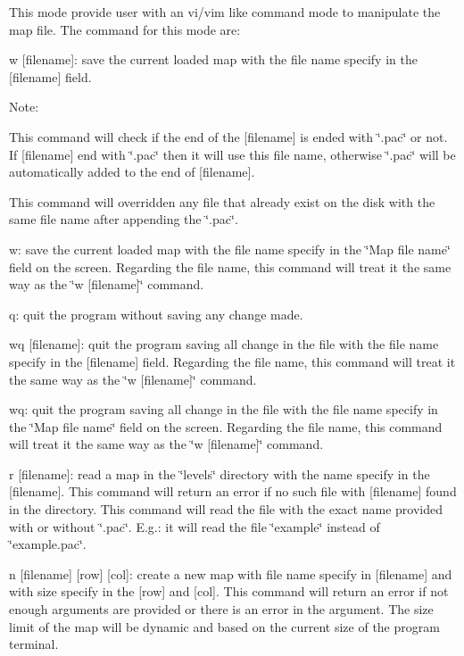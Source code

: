 This mode provide user with an vi/vim like command mode to manipulate the map file. The command for this mode are\-:

w \mbox{[}filename\mbox{]}\-: save the current loaded map with the file name specify in the \mbox{[}filename\mbox{]} field.

Note\-:

This command will check if the end of the \mbox{[}filename\mbox{]} is ended with \char`\"{}.\-pac\char`\"{} or not. If \mbox{[}filename\mbox{]} end with \char`\"{}.\-pac\char`\"{} then it will use this file name, otherwise \char`\"{}.\-pac\char`\"{} will be automatically added to the end of \mbox{[}filename\mbox{]}.

This command will overridden any file that already exist on the disk with the same file name after appending the \char`\"{}.\-pac\char`\"{}.

w\-: save the current loaded map with the file name specify in the \char`\"{}\-Map
      file name\char`\"{} field on the screen. Regarding the file name, this command will treat it the same way as the \char`\"{}w \mbox{[}filename\mbox{]}\char`\"{} command.

q\-: quit the program without saving any change made.

wq \mbox{[}filename\mbox{]}\-: quit the program saving all change in the file with the file name specify in the \mbox{[}filename\mbox{]} field. Regarding the file name, this command will treat it the same way as the \char`\"{}w \mbox{[}filename\mbox{]}\char`\"{} command.

wq\-: quit the program saving all change in the file with the file name specify in the \char`\"{}\-Map file name\char`\"{} field on the screen. Regarding the file name, this command will treat it the same way as the \char`\"{}w \mbox{[}filename\mbox{]}\char`\"{} command.

r \mbox{[}filename\mbox{]}\-: read a map in the \char`\"{}levels\char`\"{} directory with the name specify in the \mbox{[}filename\mbox{]}. This command will return an error if no such file with \mbox{[}filename\mbox{]} found in the directory. This command will read the file with the exact name provided with or without \char`\"{}.\-pac\char`\"{}. E.\-g.\-: it will read the file \char`\"{}example\char`\"{} instead of \char`\"{}example.\-pac\char`\"{}.

n \mbox{[}filename\mbox{]} \mbox{[}row\mbox{]} \mbox{[}col\mbox{]}\-: create a new map with file name specify in \mbox{[}filename\mbox{]} and with size specify in the \mbox{[}row\mbox{]} and \mbox{[}col\mbox{]}. This command will return an error if not enough arguments are provided or there is an error in the argument. The size limit of the map will be dynamic and based on the current size of the program terminal.

